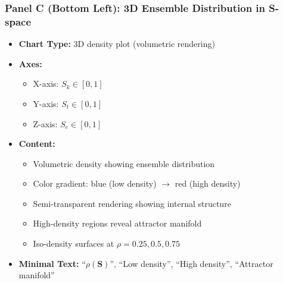 \subsubsection*{Panel C (Bottom Left): 3D Ensemble Distribution in S-space}
\begin{itemize}
\item \textbf{Chart Type:} 3D density plot (volumetric rendering)
\item \textbf{Axes:}
  \begin{itemize}
  \item X-axis: $S_k \in [0,1]$
  \item Y-axis: $S_t \in [0,1]$
  \item Z-axis: $S_e \in [0,1]$
  \end{itemize}
\item \textbf{Content:}
  \begin{itemize}
  \item Volumetric density showing ensemble distribution
  \item Color gradient: blue (low density) $\to$ red (high density)
  \item Semi-transparent rendering showing internal structure
  \item High-density regions reveal attractor manifold
  \item Iso-density surfaces at $\rho = 0.25, 0.5, 0.75$
  \end{itemize}
\item \textbf{Minimal Text:} ``$\rho(\mathbf{S})$'', ``Low density'', ``High density'', ``Attractor manifold''
\end{itemize}

